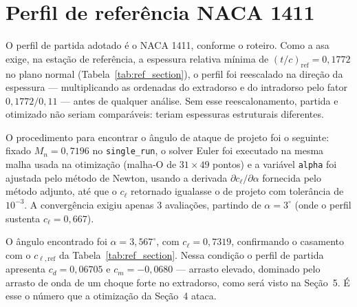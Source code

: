 \newpage
\section{Perfil de referência NACA 1411}

O perfil de partida adotado é o NACA 1411, conforme o roteiro. Como a asa
exige, na estação de referência, a espessura relativa mínima de
$(t/c)_{\mathrm{ref}} = 0{,}1772$ no plano normal
(Tabela~\ref{tab:ref_section}), o perfil foi reescalado na direção da
espessura --- multiplicando as ordenadas do extradorso e do intradorso pelo
fator $0{,}1772/0{,}11$ --- antes de qualquer análise. Sem esse
reescalonamento, partida e otimizado não seriam comparáveis: teriam
espessuras estruturais diferentes.

O procedimento para encontrar o ângulo de ataque de projeto foi o seguinte:
fixado $M_n = 0{,}7196$ no \texttt{single\_run}, o solver Euler foi executado
na mesma malha usada na otimização (malha-O de $31\times 49$ pontos) e a
variável \texttt{alpha} foi ajustada pelo método de Newton, usando a derivada
$\partial c_\ell/\partial \alpha$ fornecida pelo método adjunto, até que o
$c_\ell$ retornado igualasse o de projeto com tolerância de $10^{-3}$. A
convergência exigiu apenas 3 avaliações, partindo de $\alpha = 3^\circ$
(onde o perfil sustenta $c_\ell = 0{,}667$).

O ângulo encontrado foi $\alpha = 3{,}567^\circ$, com $c_\ell = 0{,}7319$,
confirmando o casamento com o $c_{\ell,\mathrm{ref}}$ da
Tabela~\ref{tab:ref_section}. Nessa condição o perfil de partida apresenta
$c_d = 0{,}06705$ e $c_m = -0{,}0680$ --- arrasto elevado, dominado pelo
arrasto de onda de um choque forte no extradorso, como será visto na
Seção~5. É esse o número que a otimização da Seção~4 ataca.
